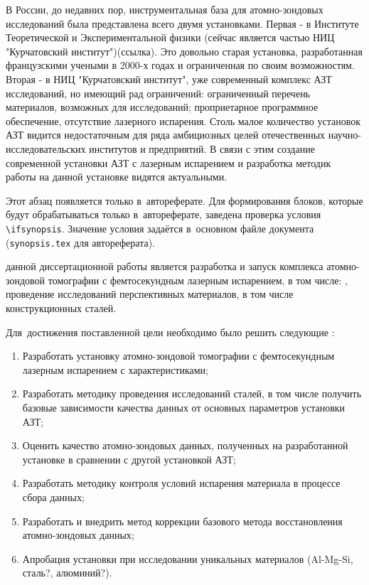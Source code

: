 В России, до недавних пор, инструментальная база для атомно-зондовых исследований была представлена всего двумя установками. Первая - в Институте Теоретической и Экспериментальной физики (сейчас является частью НИЦ "Курчатовский институт")(ссылка). Это довольно старая установка, разработанная французскими учеными в 2000-х годах и ограниченная по своим возможностям. Вторая - в НИЦ "Курчатовский институт", уже современный комплекс АЗТ исследований, но имеющий рад ограничений: ограниченный перечень материалов, возможных для исследований; проприетарное программное обеспечение, отсутствие лазерного испарения. Столь малое количество установок АЗТ видится недостаточным для ряда амбициозных целей отечественных научно-исследовательских институтов и предприятий. В связи с этим создание современной установки АЗТ с лазерным испарением и разработка методик работы на данной установке видятся актуальными.

\ifsynopsis
Этот абзац появляется только в~автореферате.
Для формирования блоков, которые будут обрабатываться только в~автореферате,
заведена проверка условия \verb!\!\verb!ifsynopsis!.
Значение условия задаётся в~основном файле документа (\verb!synopsis.tex! для
автореферата).
\else
\fi


{\aim} данной диссертационной работы является разработка и запуск комплекса атомно-зондовой томографии с фемтосекундным лазерным испарением, в том числе: , проведение исследований перспективных материалов, в том числе конструкционных сталей.%

Для~достижения поставленной цели необходимо было решить следующие {\tasks}:
\begin{enumerate}[beginpenalty=10000] %
  \item Разработать установку атомно-зондовой томографии с фемтосекундным лазерным испарением с характеристиками;
  \item Разработать методику проведения исследований сталей, в том числе получить базовые зависимости качества данных от основных параметров установки АЗТ;
  \item Оценить качество атомно-зондовых данных, полученных на разработанной установке в сравнении с другой установкой АЗТ;
  \item Разработать методику контроля условий испарения материала в процессе сбора данных;
  \item Разработать и внедрить метод коррекции базового метода восстановления атомно-зондовых данных;
  \item Апробация установки при исследовании уникальных материалов (Al-Mg-Si, сталь?, алюминий?).
\end{enumerate}


